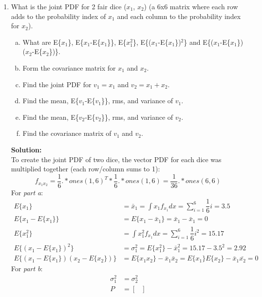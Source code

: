 \documentclass[11pt]{article}
\newcommand{\solution}{\textbf{Solution: \\}}
\begin{document}
\begin{enumerate}[label=\textbf{\arabic*.}]
  \item What is the joint PDF for 2 fair dice ($x_1$, $x_2$) (a 6x6 matrix 
  where each row adds to the probability index of $x_1$ and each column to 
  the probability index for $x_2$).
  \begin{enumerate}[(a)]
    \itemsep -2pt
    \item What are E\{$x_1$\}, E\{$x_1$-E\{$x_1$\}\}, E\{$x_1^2$\}, 
    E\{($x_1$-E\{$x_1$\})$^2$\} and E\{($x_1$-E\{$x_1$\})($x_2$-E\{$x_2$\})\}.
    \item Form the covariance matrix for $x_1$ and $x_2$.
    \item Find the joint PDF for $v_1=x_1$ and $v_2=x_1+x_2$.
    \item Find the mean, E\{$v_1$-E\{$v_1$\}\}, rms, and variance of $v_1$.
    \item Find the mean, E\{$v_2$-E\{$v_2$\}\}, rms, and variance of $v_2$.
    \item Find the covariance matrix of $v_1$ and $v_2$.
  \end{enumerate}
  \solution
  To create the joint PDF of two dice, the vector PDF for each dice was 
  multiplied together (each row/column sums to 1):
  \begin{equation*}
    f_{x_1x_2} = \dfrac{1}{6}.*ones(1,6)^T * \dfrac{1}{6}.*ones(1,6) = \dfrac{1}{36}.*ones(6,6)
  \end{equation*}
  For \emph{part a}:
  \begin{equation*}
    \begin{split}
      E\{x_1\} &= \bar{x}_1 = \int x_1f_{x_1}dx = \sum_{i=1}^{6}\dfrac{1}{6}i = 3.5 \\
      E\{x_1-E\{x_1\}\} &= E\{x_1-\bar{x}_1\} = \bar{x}_1 - \bar{x}_1 = 0 \\
      E\{x_1^2\} &= \int x_1^2f_{x_1}dx = \sum_{i=1}^{6}\dfrac{1}{6}i^2 = 15.17 \\
      E\{(x_1-E\{x_1\})^2\} &= \sigma_1^2 = E\{x_1^2\} - \bar{x}_1^2 = 15.17-3.5^2 = 2.92 \\
      E\{(x_1-E\{x_1\})(x_2-E\{x_2\})\} &= E\{x_1x_2\}-\bar{x}_1\bar{x}_2 = E\{x_1\}E\{x_2\}-\bar{x}_1\bar{x_2} = 0
    \end{split}
  \end{equation*}
  For \emph{part b}:
  \begin{equation*}
    \begin{split}
      \sigma_1^2 &= \sigma_2^2 \\
      P &=
      \begin{bmatrix}

\end{bmatrix}
\end{split}
\end{equation*}
\end{enumerate}
\end{document}
